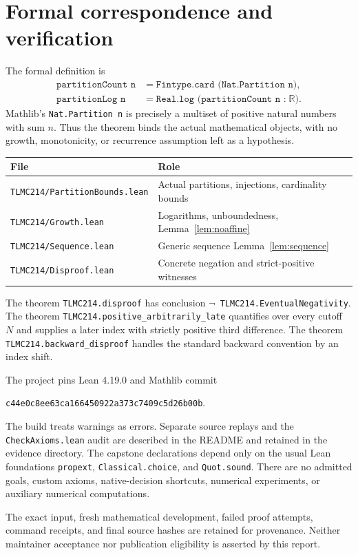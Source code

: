 \documentclass[11pt]{article}
\newcommand{\R}{\mathbb R}
\begin{document}
\section{Formal correspondence and verification}
The formal definition is
\[
\begin{aligned}
\texttt{partitionCount n}&=\texttt{Fintype.card (Nat.Partition n)},\\
\texttt{partitionLog n}&=\texttt{Real.log (partitionCount n :}\;\R\texttt{)}.
\end{aligned}
\]
Mathlib's \texttt{Nat.Partition n} is precisely a multiset of positive natural numbers with sum $n$. Thus the theorem binds the actual mathematical objects, with no growth, monotonicity, or recurrence assumption left as a hypothesis.

\begin{center}
\begin{tabular}{ll}
\textbf{File} & \textbf{Role}\\\hline
\texttt{TLMC214/PartitionBounds.lean} & Actual partitions, injections, cardinality bounds\\
\texttt{TLMC214/Growth.lean} & Logarithms, unboundedness, Lemma~\ref{lem:noaffine}\\
\texttt{TLMC214/Sequence.lean} & Generic sequence Lemma~\ref{lem:sequence}\\
\texttt{TLMC214/Disproof.lean} & Concrete negation and strict-positive witnesses
\end{tabular}
\end{center}
The theorem \texttt{TLMC214.disproof} has conclusion
\texttt{\(\neg\) TLMC214.EventualNegativity}.
The theorem \texttt{TLMC214.positive\_arbitrarily\_late} quantifies over every cutoff $N$ and supplies a later index with strictly positive third difference. The theorem \texttt{TLMC214.backward\_disproof} handles the standard backward convention by an index shift.

The project pins Lean 4.19.0 and Mathlib commit
\begin{center}\small\texttt{c44e0c8ee63ca166450922a373c7409c5d26b00b}.\end{center}
The build treats warnings as errors. Separate source replays and the \texttt{CheckAxioms.lean} audit are described in the README and retained in the evidence directory. The capstone declarations depend only on the usual Lean foundations \texttt{propext}, \texttt{Classical.choice}, and \texttt{Quot.sound}. There are no admitted goals, custom axioms, native-decision shortcuts, numerical experiments, or auxiliary numerical computations.

The exact input, fresh mathematical development, failed proof attempts, command receipts, and final source hashes are retained for provenance. Neither maintainer acceptance nor publication eligibility is asserted by this report.
\end{document}
